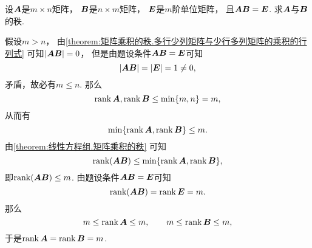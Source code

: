 \begin{example}
设\(\boldsymbol{A}\)是\(m \times n\)矩阵，
\(\boldsymbol{B}\)是\(n \times m\)矩阵，
\(\boldsymbol{E}\)是\(m\)阶单位矩阵，
且\(\boldsymbol{A} \boldsymbol{B} = \boldsymbol{E}\).
求\(\boldsymbol{A}\)与\(\boldsymbol{B}\)的秩.
\begin{solution}
假设\(m > n\)，
由\cref{theorem:矩阵乘积的秩.多行少列矩阵与少行多列矩阵的乘积的行列式}
可知\(\abs{\boldsymbol{A} \boldsymbol{B}} = 0\)，
但是由题设条件\(\boldsymbol{A} \boldsymbol{B} = \boldsymbol{E}\)可知\[
	\abs{\boldsymbol{A} \boldsymbol{B}} = \abs{\boldsymbol{E}} = 1 \neq 0,
\]
矛盾，故必有\(m \leq n\).
那么\[
	\rank\boldsymbol{A},\rank\boldsymbol{B} \leq \min\{m,n\} = m,
\]
从而有\[
	\min\{\rank\boldsymbol{A},\rank\boldsymbol{B}\} \leq m.
\]
由\cref{theorem:线性方程组.矩阵乘积的秩} 可知\[
	\rank(\boldsymbol{A} \boldsymbol{B}) \leq \min\{\rank\boldsymbol{A},\rank\boldsymbol{B}\},
\]
即\(\rank(\boldsymbol{A} \boldsymbol{B}) \leq m\).
由题设条件\(\boldsymbol{A} \boldsymbol{B} = \boldsymbol{E}\)可知\[
	\rank(\boldsymbol{A} \boldsymbol{B}) = \rank\boldsymbol{E} = m.
\]
那么\[
	m \leq \rank\boldsymbol{A} \leq m,
	\qquad
	m \leq \rank\boldsymbol{B} \leq m,
\]
于是\(\rank\boldsymbol{A} = \rank\boldsymbol{B} = m\).
\end{solution}
\end{example}

